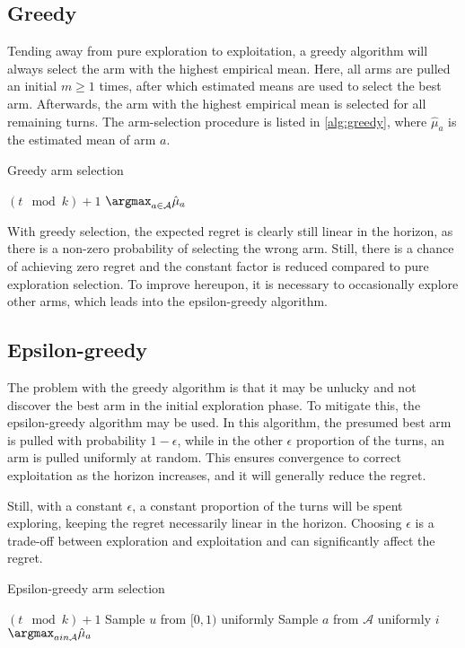 \subsection{Greedy}
Tending away from pure exploration to exploitation, a greedy algorithm will always select the arm with the highest empirical mean.
Here, all arms are pulled an initial $m \geq 1$ times, after which estimated means are used to select the best arm.
Afterwards, the arm with the highest empirical mean is selected for all remaining turns.
The arm-selection procedure is listed in \cref{alg:greedy}, where $\hat{\mu}_a$ is the estimated mean of arm $a$.
\begin{algorithm}
    \caption{Greedy arm selection}
    \label{alg:greedy}
    \begin{algorithmic}
        \State \Return $(t \mod k) + 1$
        \Else
        \State \Return $\argmax_{a \in \mathcal{A}} \hat{\mu}_a$
        \EndIf
    \end{algorithmic}
\end{algorithm}

With greedy selection, the expected regret is clearly still linear in the horizon, as there is a non-zero probability of selecting the wrong arm.
Still, there is a chance of achieving zero regret and the constant factor is reduced compared to pure exploration selection.
To improve hereupon, it is necessary to occasionally explore other arms, which leads into the epsilon-greedy algorithm.

\subsection{Epsilon-greedy}
The problem with the greedy algorithm is that it may be unlucky and not discover the best arm in the initial exploration phase.
To mitigate this, the epsilon-greedy algorithm may be used.
In this algorithm, the presumed best arm is pulled with probability $1-\epsilon$, while in the other $\epsilon$ proportion of the turns, an arm is pulled uniformly at random.
This ensures convergence to correct exploitation as the horizon increases, and it will generally reduce the regret.

Still, with a constant $\epsilon$, a constant proportion of the turns will be spent exploring, keeping the regret necessarily linear in the horizon.
Choosing $\epsilon$ is a trade-off between exploration and exploitation and can significantly affect the regret.

\begin{algorithm}
    \caption{Epsilon-greedy arm selection}
    \label{alg:eps_greedy}
    \begin{algorithmic}
        \State \Return $(t \mod k) + 1$
        \Else
        \State Sample $u$ from $[0,1)$ uniformly
        \State Sample $a$ from $\mathcal{A}$ uniformly
        \State \Return $i$
        \Else
        \State \Return $\argmax_{a in \mathcal{A}}\hat{\mu}_a$
        \EndIf
        \EndIf
    \end{algorithmic}
\end{algorithm}


